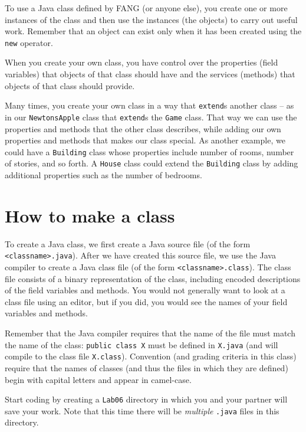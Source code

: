 \documentclass[12pt]{article}
\newcommand{\code}{\texttt}
\newcommand{\fname}{\texttt}
\begin{document}
To use a Java class defined by FANG
(or anyone else),
you create one or more instances of the class and then
use the instances (the objects) to carry out useful work.
Remember that an object can exist only when it has been created
using the \verb'new' operator.

When you create your own class, you have control over the properties
(field variables)
that objects of that class should have and the services
(methods) that objects of that class should provide.

Many times, you create your own class in a way that \code{extend}s
another class -- as in our \code{NewtonsApple} class that
\code{extend}s the \code{Game} class.  That way we can use the
properties and methods that the other class describes, while adding
our own properties and methods that makes our class special.
As another example, we could have a \code{Building} class
whose properties include number of rooms, number of stories,
and so forth.  A \code{House} class could extend the \code{Building}
class by adding additional properties such as the number of bedrooms.

\section*{How to make a class}

To create a Java class, we first create a Java source file (of the
form \fname{<classname>.java}).
After we have created this source file, we use the Java compiler to
create a Java class file (of the form \fname{<classname>.class}).
The class file consists of a binary representation of the class,
including encoded descriptions of the field variables and methods.
You would not generally want to look at a class file using
an editor, but if you did, you would see the names of your field
variables and methods.

Remember that the Java compiler requires
that the name of the file must match the
name of the class: \code{public class X} must be defined in
\fname{X.java} (and will compile to the class file
\fname{X.class}). Convention (and grading criteria in this class)
require that the names of classes (and thus the files in which they
are defined) begin with capital letters and appear in camel-case. 

Start coding by creating a \fname{Lab06} directory in which you and
your partner will save your work. Note that this time there will be
\emph{multiple} \fname{.java} files in this directory.
\end{document}
